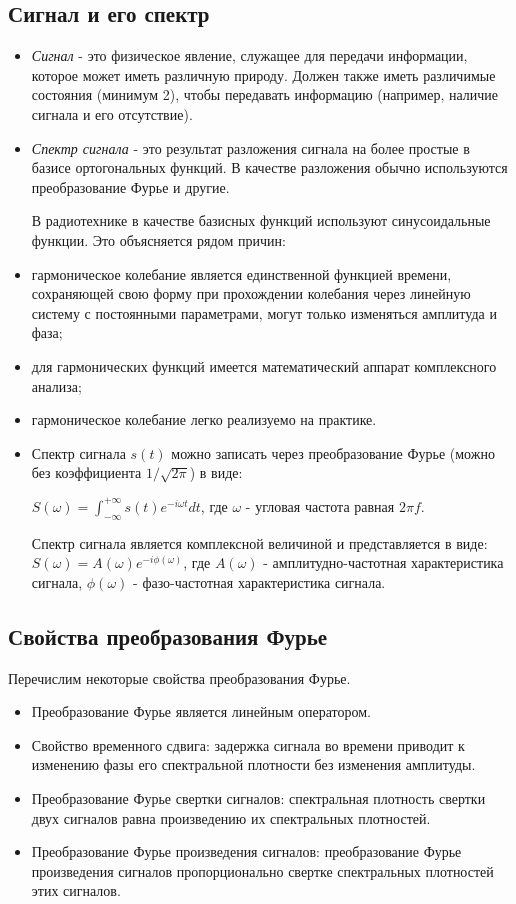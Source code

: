\subsection{Сигнал и его спектр}
\begin{itemize}
	\item \textit{Сигнал} - это физическое явление, служащее для передачи информации, которое может иметь различную природу. Должен также иметь различимые состояния (минимум 2), чтобы передавать информацию (например, наличие сигнала и его отсутствие).
	
	\item \textit{Спектр сигнала} - это результат разложения сигнала на более простые в базисе ортогональных функций. В качестве разложения обычно используются преобразование Фурье и другие.
	
	\begin{center}
		В радиотехнике в качестве базисных функций используют синусоидальные функции. Это объясняется рядом причин:
	\end{center}
	\item гармоническое колебание является единственной функцией времени, сохраняющей свою форму при прохождении колебания через линейную систему с постоянными параметрами, могут только изменяться амплитуда и фаза;
	\item для гармонических функций имеется математический аппарат комплексного анализа;
	\item гармоническое колебание легко реализуемо на практике. 
	
	\item Спектр сигнала $s(t)$ можно записать через преобразование Фурье (можно без коэффициента $ 1/{\sqrt {2\pi }}$) в виде:
	
	$ S(\omega )=\int_{-\infty }^{+\infty }s(t)e^{-i\omega t}dt $, где $\omega $ - угловая частота равная $ 2\pi f $.
	
	Спектр сигнала является комплексной величиной и представляется в виде: \\
	$ S(\omega )=A(\omega )e^{-i\phi (\omega )}$, где $A(\omega )$ - амплитудно-частотная характеристика сигнала, $\phi (\omega ) $ - фазо-частотная характеристика сигнала.
	\end {itemize}

\subsection{Свойства преобразования Фурье}
Перечислим некоторые свойства преобразования Фурье.
\begin{itemize}
	\item Преобразование Фурье является линейным оператором.
	\item Свойство временного сдвига: задержка сигнала во времени приводит к изменению фазы его спектральной плотности без изменения амплитуды.
	\item Преобразование Фурье свертки сигналов: спектральная плотность свертки двух сигналов равна произведению их спектральных плотностей.
	\item Преобразование Фурье произведения сигналов: преобразование Фурье произведения сигналов пропорционально свертке спектральных плотностей этих сигналов.
\end{itemize}

